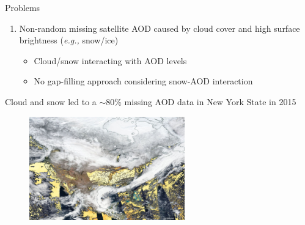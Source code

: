 \documentclass{beamer}
\begin{document}
\begin{frame}{Problems}
    \begin{enumerate}
        \item<1-> Non-random missing satellite AOD caused by cloud cover and high surface brightness (\textit{e.g.,} snow/ice) 
            \begin{itemize}
                \item<2-> \textcolor[rgb]{1,0.4,0}{Cloud/snow interacting with AOD levels}
                \item<3-> \textcolor[rgb]{1,0.4,0}{No gap-filling approach considering snow-AOD interaction}
            \end{itemize}
    \end{enumerate}
    \vspace{-0.1cm}
    \textcolor[rgb]{0.1,0.1,0.6}{Cloud and snow led to a $\sim$80\% missing AOD data in New York State in 2015}
    \begin{figure}
        \centering
        \includegraphics[width=0.6\textwidth]{img/missing.jpg}
    \end{figure}
\end{frame}
\end{document}
